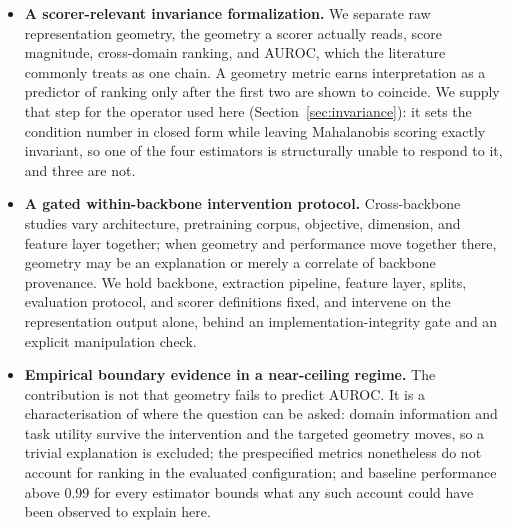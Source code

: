 \begin{itemize}
  \item \textbf{A scorer-relevant invariance formalization.} We separate raw
        representation geometry, the geometry a scorer actually reads, score
        magnitude, cross-domain ranking, and AUROC, which the literature
        commonly treats as one chain. A geometry metric earns interpretation as
        a predictor of ranking only after the first two are shown to coincide.
        We supply that step for the operator used here
        (Section~\ref{sec:invariance}): it sets the condition number in closed
        form while leaving Mahalanobis scoring exactly invariant, so one of the
        four estimators is structurally unable to respond to it, and three are
        not.
  \item \textbf{A gated within-backbone intervention protocol.} Cross-backbone
        studies vary architecture, pretraining corpus, objective, dimension,
        and feature layer together; when geometry and performance move
        together there, geometry may be an explanation or merely a correlate of
        backbone provenance. We hold backbone, extraction pipeline, feature
        layer, splits, evaluation protocol, and scorer definitions fixed, and
        intervene on the representation output alone, behind an
        implementation-integrity gate and an explicit manipulation check.
  \item \textbf{Empirical boundary evidence in a near-ceiling regime.} The
        contribution is not that geometry fails to predict AUROC. It is a
        characterisation of where the question can be asked: domain information
        and task utility survive the intervention and the targeted geometry
        moves, so a trivial explanation is excluded; the prespecified metrics
        nonetheless do not account for ranking in the evaluated configuration;
        and baseline performance above 0.99 for every estimator bounds what any
        such account could have been observed to explain here.
\end{itemize}
